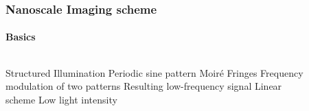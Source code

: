 \documentclass[mathserif,16pt,xcolor=table]{beamer}
\begin{document}
\begin{frame}[t]
  \frametitle{Nanoscale Imaging scheme}
  \framesubtitle{Basics}
  \begin{columns}[T] %
    \begin{column}{.4\textwidth}
      \begin{outline}[itemize]
        \1 Structured Illumination
        \2 Periodic sine pattern
        \1 Moiré Fringes
        \2 Frequency modulation of two patterns
        \2 Resulting low-frequency signal
        \1 Linear scheme
        \2 Low light intensity
      \end{outline}
    \end{column}
    \begin{column}[T]{.6\textwidth}
      \begin{center}
        \begin{figure}[t!]
          \vspace*{-2cm}
          \centering
          \subfloat{\scalebox{.07}{}
          \label{fig:test}} \hfil
          \subfloat{\scalebox{.07}{}
          \label{fig:sim_hi}}
        \end{figure}
        \begin{figure}
          \vspace*{-.5cm}
          \centering
          \def\svgwidth{.6\linewidth}
          
        \end{figure}
      \end{center}
      \end{column}%
    \end{columns}
  \end{frame}
\end{document}

